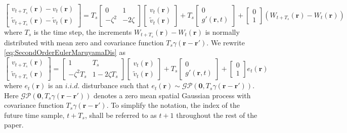 \documentclass[a4paper,10pt]{article}
\begin{document}
\begin{equation}\label{eq:SecondOrderEulerMaruyamaDis}
 \begin{bmatrix} v_{t+T_s}(\mathbf r)-v_t(\mathbf r) \\
\tilde{v}_{t+T_s}(\mathbf r)-\tilde{v}_t(\mathbf
r)\end{bmatrix}=T_s\begin{bmatrix}0 & 1 \\ -\zeta^2 & -2\zeta
\end{bmatrix}\begin{bmatrix} v_t(\mathbf r)\\ \tilde{v}_t(\mathbf
r)\end{bmatrix}+T_s\begin{bmatrix}0 \\ g'(\mathbf r,
t)\end{bmatrix}+\begin{bmatrix}0 \\ 1 \end{bmatrix}(W_{t+T_s}(\mathbf
r)-W_t(\mathbf r))
\end{equation}
where $T_s$ is the time step, the increments $W_{t+T_s}(\mathbf r)-W_t(\mathbf
r)$ is normally distributed with mean zero and covariance function
$T_s\gamma(\mathbf r-\mathbf r')$. We rewrite
\eqref{eq:SecondOrderEulerMaruyamaDis} as
\begin{equation}
 \begin{bmatrix} v_{t+T_s}(\mathbf r) \\ \tilde{v}_{t+T_s}(\mathbf
r)\end{bmatrix}=\begin{bmatrix}1 & T_s \\ -\zeta^2 T_s & 1-2\zeta T_s
\end{bmatrix}\begin{bmatrix} v_t(\mathbf r)\\ \tilde{v}_t(\mathbf
r)\end{bmatrix}+T_s\begin{bmatrix}0 \\ g'(\mathbf r,
t)\end{bmatrix}+\begin{bmatrix}0 \\ 1 \end{bmatrix}e_t(\mathbf r)
\end{equation}
 where $e_t(\mathbf{r})$ is an $i.i.d.$ disturbance such that
$e_t(\mathbf{r})\sim\mathcal{GP}(\mathbf 0,T_s\gamma(\mathbf{r}-\mathbf{r}'))$.
Here $\mathcal{GP}(\mathbf 0,T_s\gamma(\mathbf{r}-\mathbf{r}'))$ denotes a zero
mean spatial Gaussian process with covariance function
$T_s\gamma(\mathbf{r}-\mathbf{r}')$. To simplify the notation, the index of the
future time sample, $t+T_s$, shall be referred to as $t+1$ throughout the rest
of the paper. 
\end{document}
